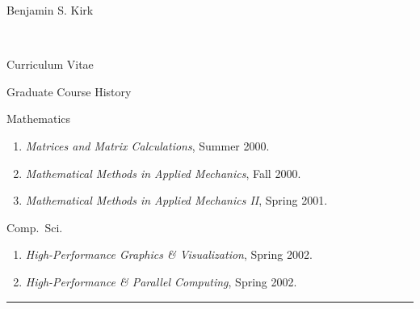 \documentclass[10pt]{report}
\begin{document}
\begin{cv}{\centerline{\Large Benjamin S. Kirk}\\
    \centerline{\large Curriculum Vitae}}
\begin{cvlist}{Graduate Course History}
      \vspace{.5em}
      \item[Mathematics]

	\begin{enumerate}
  	  \item \emph{Matrices and Matrix Calculations}, Summer 2000.
	  \item \emph{Mathematical Methods in Applied Mechanics}, Fall 2000.
	  \item \emph{Mathematical Methods in Applied Mechanics II}, Spring 2001.
	\end{enumerate}

      \vspace{.5em}
      \item[Comp.\ Sci.]

	\begin{enumerate}
	  \item \emph{High-Performance Graphics \& Visualization}, Spring 2002.
	  \item \emph{High-Performance \& Parallel Computing}, Spring 2002.
	\end{enumerate}
  \end{cvlist}



{\hfill \hrule\hfill\vspace{.1mm} \\}
\end{cv}
\end{document}
